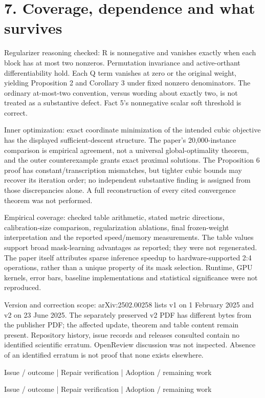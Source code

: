 \documentclass[10pt]{article}
\begin{document}
\section*{7. Coverage, dependence and what survives}
Regularizer reasoning checked: R is nonnegative and vanishes exactly when each block has at most two nonzeros. Permutation invariance and active-orthant differentiability hold. Each Q term vanishes at zero or the original weight, yielding Proposition 2 and Corollary 3 under fixed nonzero denominators. The ordinary at-most-two convention, versus wording about exactly two, is not treated as a substantive defect. Fact 5’s nonnegative scalar soft threshold is correct.\par
Inner optimization: exact coordinate minimization of the intended cubic objective has the displayed sufficient-descent structure. The paper’s 20,000-instance comparison is empirical agreement, not a universal global-optimality theorem, and the outer counterexample grants exact proximal solutions. The Proposition 6 proof has constant/transcription mismatches, but tighter cubic bounds may recover its iteration order; no independent substantive finding is assigned from those discrepancies alone. A full reconstruction of every cited convergence theorem was not performed.\par
Empirical coverage: checked table arithmetic, stated metric directions, calibration-size comparison, regularization ablations, final frozen-weight interpretation and the reported speed/memory measurements. The table values support broad mask-learning advantages as reported; they were not regenerated. The paper itself attributes sparse inference speedup to hardware-supported 2:4 operations, rather than a unique property of its mask selection. Runtime, GPU kernels, error bars, baseline implementations and statistical significance were not reproduced.\par
Version and correction scope: arXiv:2502.00258 lists v1 on 1 February 2025 and v2 on 23 June 2025. The separately preserved v2 PDF has different bytes from the publisher PDF; the affected update, theorem and table content remain present. Repository history, issue records and releases consulted contain no identified scientific erratum. OpenReview discussion was not inspected. Absence of an identified erratum is not proof that none exists elsewhere.\par
Issue / outcome | Repair verification | Adoption / remaining work\par
Issue / outcome | Repair verification | Adoption / remaining work\par
\end{document}
